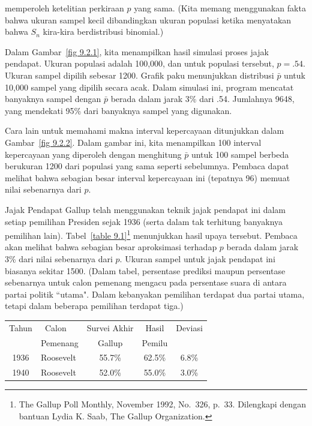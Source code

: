 \begin{example}
memperoleh ketelitian perkiraan $p$ yang sama.  (Kita memang menggunakan fakta bahwa ukuran sampel kecil
dibandingkan ukuran populasi ketika menyatakan bahwa $S_n$ kira-kira berdistribusi
binomial.)
\par
Dalam Gambar~\ref{fig 9.2.1}, kita menampilkan hasil simulasi proses jajak pendapat.  Ukuran populasi
adalah 100{,}000, dan untuk populasi tersebut, $p = .54$.  Ukuran sampel dipilih sebesar
1200.  Grafik paku menunjukkan distribusi $\bar p$ untuk 10{,}000 sampel yang dipilih secara
acak.   Dalam simulasi ini, program mencatat banyaknya sampel dengan
$\bar p$ berada dalam jarak 3\% dari .54.  Jumlahnya 9648, yang mendekati
95\% dari banyaknya sampel yang digunakan.
\par                        
Cara lain untuk memahami makna interval kepercayaan ditunjukkan dalam Gambar~\ref{fig
9.2.2}.  Dalam gambar ini, kita menampilkan 100 interval kepercayaan yang diperoleh dengan menghitung $\bar p$
untuk 100 sampel berbeda berukuran 1200 dari populasi yang sama seperti sebelumnya.  Pembaca dapat melihat
bahwa sebagian besar interval kepercayaan ini (tepatnya 96) memuat nilai sebenarnya dari $p$.
\par
Jajak Pendapat Gallup telah menggunakan teknik jajak pendapat ini dalam setiap
pemilihan Presiden sejak 1936 (serta dalam tak terhitung banyaknya
pemilihan lain).  Tabel~\ref{table 9.1}\footnote{The Gallup Poll Monthly, November 1992, 
No.\ 326, p.\ 33.  Dilengkapi dengan bantuan Lydia K. Saab, The Gallup Organization.} menunjukkan
hasil upaya tersebut.  Pembaca akan melihat bahwa sebagian besar aproksimasi terhadap $p$ berada
dalam jarak 3\% dari nilai sebenarnya dari $p$.  Ukuran sampel untuk jajak pendapat ini biasanya sekitar
1500.  (Dalam tabel, persentase prediksi maupun persentase sebenarnya untuk calon pemenang mengacu
pada persentase suara di antara partai politik ``utama". Dalam kebanyakan pemilihan terdapat
dua partai utama, tetapi dalam beberapa pemilihan terdapat tiga.) 
\begin{table}
\centering
\begin{tabular}{clccc} Tahun &$\,$ Calon &Survei Akhir &Hasil 
&Deviasi \\
&Pemenang&Gallup&Pemilu&\\
\hline
1936 & Roosevelt  & 55.7\% & 62.5\% & 6.8\%\\
1940 & Roosevelt  & 52.0\% & 55.0\% & 3.0\%\\

\end{tabular}
\end{table}
\end{example}
